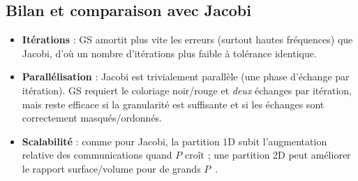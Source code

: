 \documentclass{article}
\begin{document}
\subsection{Bilan et comparaison avec Jacobi}
\begin{itemize}
  \item \textbf{Itérations} : GS amortit plus vite les erreurs (surtout hautes fréquences) que Jacobi, d’où un nombre d’itérations plus faible à tolérance identique.
  \item \textbf{Parallélisation} : Jacobi est trivialement parallèle (une phase d’échange par itération). GS requiert le coloriage noir/rouge et \emph{deux} échanges par itération, mais reste efficace si la granularité est suffisante et si les échanges sont correctement masqués/ordonnés.
  \item \textbf{Scalabilité} : comme pour Jacobi, la partition 1D subit l’augmentation relative des communications quand $P$ croît ; une partition 2D peut améliorer le rapport surface/volume pour de grands $P$~\cite{slides4}.
\end{itemize}
\end{document}
